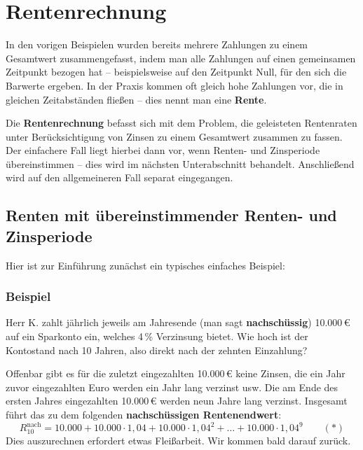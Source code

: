 \section{Rentenrechnung}

In den vorigen Beispielen wurden bereits mehrere Zahlungen zu einem Gesamtwert zusammengefasst, indem man alle Zahlungen auf einen gemeinsamen Zeitpunkt bezogen hat -- beispielsweise auf den Zeitpunkt Null, für den sich die Barwerte ergeben. In der Praxis kommen oft gleich hohe Zahlungen vor, die in gleichen Zeitabständen fließen -- dies nennt man eine \textbf{Rente}.


Die \textbf{Rentenrechnung} befasst sich mit dem Problem, die geleisteten Rentenraten unter Berücksichtigung von Zinsen zu einem Gesamtwert zusammen zu fassen. Der einfachere Fall liegt hierbei dann vor, wenn Renten- und Zinsperiode übereinstimmen -- dies wird im nächsten Unterabschnitt behandelt. Anschließend wird auf den allgemeineren Fall separat eingegangen.

\subsection{Renten mit übereinstimmender Renten- und Zinsperiode}

Hier ist zur Einführung zunächst ein typisches einfaches Beispiel:

\subsubsection{Beispiel}

Herr K. zahlt jährlich jeweils am Jahresende (man sagt \textbf{nachschüssig}) 10.000\,€ auf ein Sparkonto ein, welches 4\,\% Verzinsung bietet. Wie hoch ist der Kontostand nach 10 Jahren, also direkt nach der zehnten Einzahlung?

Offenbar gibt es für die zuletzt eingezahlten 10.000\,€ keine Zinsen, die ein Jahr zuvor eingezahlten Euro werden ein Jahr lang verzinst usw. Die am Ende des ersten Jahres eingezahlten 10.000\,€ werden neun Jahre lang verzinst. Insgesamt führt das zu dem folgenden \textbf{nachschüssigen Rentenendwert}:
\[ R_{10}^{\text{nach}} = 10.000 + 10.000 \cdot 1{,}04 + 10.000 \cdot 1{,}04^2 + \ldots + 10.000 \cdot 1{,}04^9 \qquad (*) \]
Dies auszurechnen erfordert etwas Fleißarbeit. Wir kommen bald darauf zurück.\beispielende

